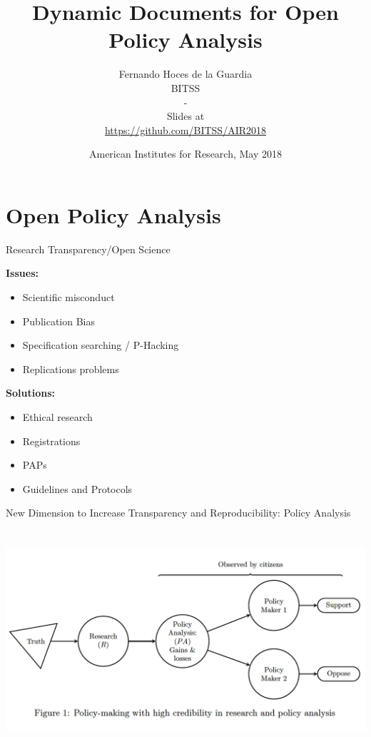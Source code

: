 \documentclass[ignorenonframetext,]{beamer}
\title{Dynamic Documents for Open Policy Analysis}
\author{Fernando Hoces de la Guardia\\
BITSS\\
-\\
Slides at\\
\hspace*{0.333em}\url{https://github.com/BITSS/AIR2018}}
\date{American Institutes for Research, May 2018}
\providecommand{\tightlist}{%
  \setlength{\itemsep}{0pt}\setlength{\parskip}{0pt}}
\begin{document}
\frame{\titlepage}

\begin{frame}
\tableofcontents[hideallsubsections]
\end{frame}
\hypertarget{open-policy-analysis}{%
\section{Open Policy Analysis}\label{open-policy-analysis}}

\begin{frame}{Research Transparency/Open Science}
\protect\hypertarget{research-transparencyopen-science}{}

\textbf{Issues:}

\begin{itemize}
\tightlist
\item
  Scientific misconduct\\
\item
  Publication Bias\\
\item
  Specification searching / P-Hacking\\
\item
  Replications problems
\end{itemize}

\textbf{Solutions:}

\begin{itemize}
\tightlist
\item
  Ethical research
\item
  Registrations
\item
  PAPs
\item
  Guidelines and Protocols
\end{itemize}

\end{frame}

\begin{frame}{New Dimension to Increase Transparency and
Reproducibility: Policy Analysis}
\protect\hypertarget{new-dimension-to-increase-transparency-and-reproducibility-policy-analysis}{}

\centering

\includegraphics[height=3.2in]{../Images/fig1.png}

\end{frame}
\end{document}
